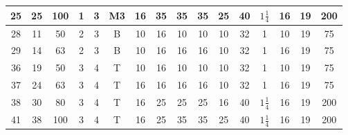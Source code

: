 \documentclass[12pt,openright,oneside,a4paper,brazil]{abntex2}
\begin{document}
\begin{table}[H]
\begin{sideways}
\begin{minipage}{\textheight}
{\begin{tabular}{c|c|c|c|c|c|c|c|c|c|c|c|c|c|c|c}
            25 & 25 & 100 & 1 & 3 & M3 & 16 & 35 & 35 & 35 & 25 & 40 & $1\frac{1}{4}$ & 16 & 19 & 200 \\ \hline
            28 & 11 & 50 & 2 & 3 & B & 10 & 16 & 10 & 10 & 10 & 32 & 1 & 10 & 19 & 75 \\ \hline
            29 & 14 & 63 & 2 & 3 & B & 10 & 16 & 16 & 16 & 10 & 32 & 1 & 16 & 19 & 75 \\ \hline
            36 & 19 & 50 & 3 & 4 & T & 10 & 16 & 10 & 10 & 10 & 32 & 1 & 10 & 19 & 75 \\ \hline
            37 & 24 & 63 & 3 & 4 & T & 16 & 16 & 16 & 16 & 10 & 32 & 1 & 16 & 19 & 75 \\ \hline
            38 & 30 & 80 & 3 & 4 & T & 16 & 25 & 25 & 25 & 16 & 40 & $1\frac{1}{4}$ & 16 & 19 & 200 \\ \hline
            41 & 38 & 100 & 3 & 4 & T & 16 & 25 & 35 & 35 & 25 & 40 & $1\frac{1}{4}$ & 16 & 19 & 200 \\ \hline
        \end{tabular}%
        }
        
        \vspace{0.15cm}
    \end{minipage}
\end{sideways}

\end{table}
\end{document}
